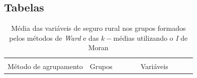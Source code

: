 \documentclass[
	12pt,				%
	openright,			%
	oneside,			%
	a4paper,			%
	chapter=TITLE,		%
	section=TITLE,		%
	english,			%
	french,				%
	spanish,			%
	brazil				%
	]{abntex2}
\begin{document}




\newpage
\begin{apendicesenv}




\newpage
\chapter{\textbf{Tabelas}}\label{tabelas}      
\begin{table}
\caption{Média das variáveis de seguro rural nos grupos formados pelos métodos de \textit{Ward} e das  $k-$médias utilizando o \textit{I} de Moran} \label{mean_I}
    \vspace{0.05cm}
    \begin{tabular}{ccrrrrrrr}
        \hline \\[-1.9ex]	 
        Método de agrupamento & Grupos & & & & Variáveis \\\cmidrule{3-9}
        

\end{tabular}
\end{table}
\end{apendicesenv}
\end{document}
